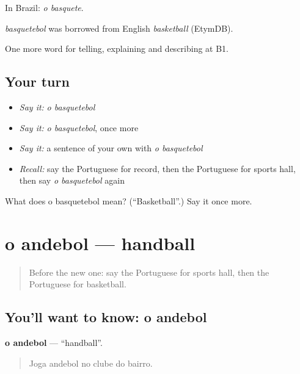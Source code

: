 In Brazil: \emph{o basquete}.

\begin{cousinweb}
\emph{basquetebol} was borrowed from English \emph{basketball} (EtymDB).
\end{cousinweb}

\begin{grammarlens}[title={What you've built}]
One more word for telling, explaining and describing at B1.
\end{grammarlens}

\subsection*{Your turn}
\begin{itemize}
\raggedright
  \item \emph{Say it:} \emph{o basquetebol}
  \item \emph{Say it:} \emph{o basquetebol}, once more
  \item \emph{Say it:} a sentence of your own with \emph{o basquetebol}
  \item \emph{Recall:} say the Portuguese for record, then the Portuguese for sports hall, then say \emph{o basquetebol} again
\end{itemize}

\begin{tcolorbox}[breakable,colback=teal!4,colframe=teal!35!black,title={Before you move on}]
What does o basquetebol mean? (\textquotedblleft{}Basketball\textquotedblright{}.) Say it once more.
\end{tcolorbox}
\section[o andebol]{o andebol — handball}

\label{lesson:PT-C512-andebol}



\begin{quote}
Before the new one: say the Portuguese for sports hall, then the Portuguese for basketball.
\end{quote}

\subsection*{You'll want to know: o andebol}
\textbf{o andebol} — \textquotedblleft{}handball\textquotedblright{}.

\begin{quote}
Joga andebol no clube do bairro.
\end{quote}

